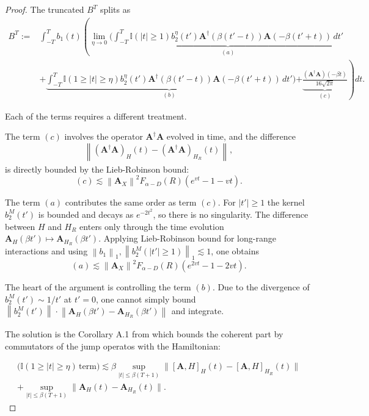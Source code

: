 \documentclass[11pt]{article}
\numberwithin{equation}{section}
\numberwithin{figure}{section}
\numberwithin{table}{section}
\theoremstyle{definition}
\theoremstyle{plain}
\theoremstyle{remark}
\newcommand{\Id}{\mathbb{I}}
\newcommand{\vA}{\bm{A}}
\newcommand{\norm}[1]{\left\lVert#1\right\rVert}
\newcommand{\normm}[2]{\left\lVert#1\right\rVert_{#2}}
\newcommand{\abs}[1]{\left \vert#1\right\vert}
\begin{document}
\begin{proof}
 
The truncated $B^T$ splits as
\begin{align}
B^T:= &\int_{-T}^{T} b_1(t) \left (
\lim_{\eta \to 0} \big(
\underbrace{\int_{-T}^{T} 
 \Id(|t| \ge 1) 
b_2^{\eta}(t') \vA^{\dagger}( \beta(t' - t)) \vA(-\beta(t' + t)) \, dt'}_{(a)}
\right. \\ \nonumber
&+\underbrace{\int_{-T}^{T} 
\Id(1 \ge |t| \ge \eta) 
b_2^{\eta}(t') \vA^{\dagger}( \beta(t' - t)) \vA(-\beta(t' + t)) \, dt'}_{(b)}\big)
\left.  +\underbrace{\frac{(\vA^{\dagger} \vA)(-\beta t)}{16 \sqrt{2\pi}}}_{(c)} \right ) dt.
    \end{align}

Each of the terms requires a different treatment.

The term $(c)$ involves the operator $\vA^\dagger \vA$ evolved in time, and the difference\[\normm{(\vA^\dagger \vA)_H(t)-(\vA^\dagger \vA)_{H_R}(t)}{} ,\]
is directly bounded by the Lieb-Robinson bound:
\begin{equation}
    (c)\lesssim \norm{\vA_X}^2 F_{\alpha-D}(R)(e^{vt}-1-vt).
\end{equation}

The term $(a)$ contributes the same order as term $(c)$. For $\abs{t'}\geq 1$ the kernel $b_2^M(t')$ is bounded and decays as $e^{-2t^2}$, so there is no singularity. The difference between $H$ and $H_R$ enters only through the time evolution $\vA_H(\beta t')\mapsto \vA_{H_R}(\beta t') $. Applying Lieb-Robinson bound for long-range interactions and using $\normm{b_1}{1},\normm{b_2^M(\abs{t'}\geq 1)}{1}\lesssim  1$, one obtains
 \begin{equation}
     (a)\lesssim \norm{\vA_X}^2 F_{\alpha-D}(R)(e^{2vt}-1-2vt).
 \end{equation}
 

The heart of the argument is controlling the term $(b)$. Due to the divergence of $b_2^M(t')\sim 1/t'$ at $t'=0$, one cannot simply bound $\normm{b_2^M(t')}{}\cdot \normm{\vA_H(\beta t')-\vA_{H_R}(\beta t')}{}$ and integrate.

The solution is the Corollary A.1 from \cite{chen_quantum_2025} which bounds the coherent part by commutators of the jump operatos with the Hamiltonian:

\begin{multline}
    \big( \Id (1 \ge |t| \ge \eta) \, \text{term} \big)\lesssim 
\beta \sup_{|t| \le \beta (T + 1)} 
\| [\vA, H]_H(t) - [\vA, H]_{H_R}(t) \|\\
\nonumber+ 
\sup_{|t| \le \beta (T + 1)} 
\| \vA_H(t) - \vA_{H_R}(t) \|.
\end{multline}


\end{proof}
\end{document}
